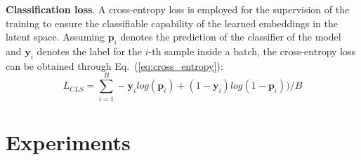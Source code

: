 \documentclass[lettersize,journal]{IEEEtran}
\newcommand{\mypar}[1]{\vspace{0.1cm}\noindent\textbf{#1}.}
\begin{document}
\mypar{Classification loss}
A cross-entropy loss is employed for the supervision of the training to ensure the classifiable capability of the learned embeddings in the latent space. Assuming $\textbf{p}_i$ denotes the prediction of the classifier of the model and $\textbf{y}_i$ denotes the label for the $i$-th sample inside a batch, the cross-entropy loss can be obtained through Eq.~(\ref{eq:cross_entropy}):
\begin{equation}
\label{eq:cross_entropy}
    L_{CLS} =\sum_{i=1}^{B} -\textbf{y}_{i}log(\textbf{p}_{i})+(1-
 \textbf{y}_{i})log(1-\textbf{p}_{i}))/B
\end{equation}






 
\section{Experiments}
\end{document}
